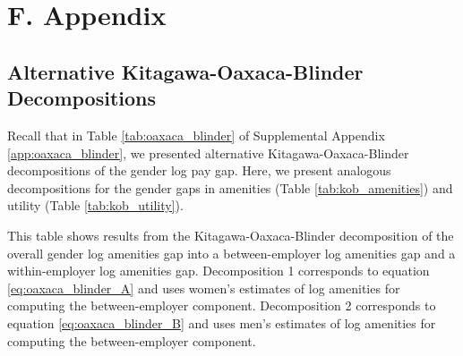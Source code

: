 

\clearpage
\section{F. {\sectionseven} Appendix\label{app:structure}}
\renewcommand*{\thepage}{\Alph{section}\arabic{page}}
\setcounter{page}{1}


\subsection{Alternative Kitagawa-Oaxaca-Blinder Decompositions\label{subsec:kob_alt}}

Recall that in Table \ref{tab:oaxaca_blinder} of Supplemental Appendix \ref{app:oaxaca_blinder}, we presented alternative Kitagawa-Oaxaca-Blinder decompositions of the gender log pay gap. Here, we present analogous decompositions for the gender gaps in amenities (Table \ref{tab:kob_amenities}) and utility (Table \ref{tab:kob_utility}).

%
\begin{table}[htbp!]
    \caption{Alternative Kitagawa-Oaxaca-Blinder decompositions of the gender gap in amenities}
    \label{tab:kob_amenities}
    \resizebox{\textwidth}{!}{%
    
    }
    \begin{tablenotes}
        \footnotesize
        This table shows results from the Kitagawa-Oaxaca-Blinder decomposition of the overall gender log amenities gap into a between-employer log amenities gap and a within-employer log amenities gap. Decomposition 1 corresponds to equation \eqref{eq:oaxaca_blinder_A} and uses women's estimates of log amenities for computing the between-employer component. Decomposition 2 corresponds to equation \eqref{eq:oaxaca_blinder_B} and uses men's estimates of log amenities for computing the between-employer component. %
    \end{tablenotes}
    \begin{tablenotes}[Source]
        \sourcemodel%
    \end{tablenotes}
\end{table}
%

